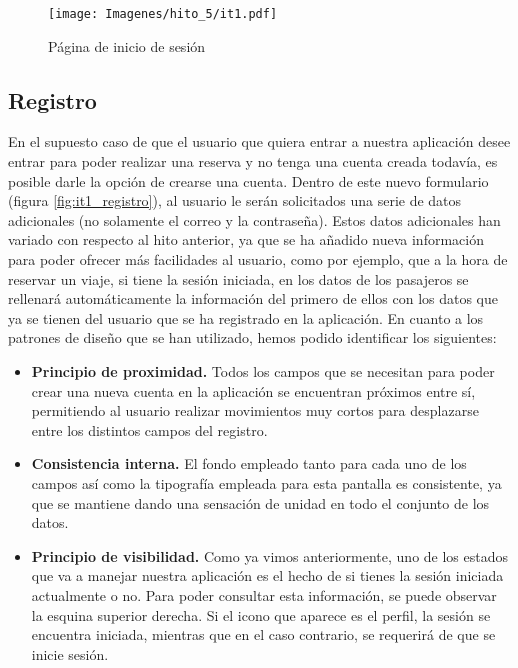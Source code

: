 \begin{figure}[H]
    \centering
    \texttt{[image: Imagenes/hito\_5/it1.pdf]}
    \caption{Página de inicio de sesión}
    \label{fig:it1_inicio_sesion}
\end{figure}

\subsection*{Registro}

En el supuesto caso de que el usuario que quiera entrar a nuestra aplicación desee entrar para
poder realizar una reserva y no tenga una cuenta creada todavía, es posible darle la opción de
crearse una cuenta. Dentro de este nuevo formulario (figura \ref{fig:it1_registro}), al usuario le serán solicitados una serie
de datos adicionales (no solamente el correo y la contraseña). Estos datos adicionales han
variado con respecto al hito anterior, ya que se ha añadido nueva información para poder ofrecer
más facilidades al usuario, como por ejemplo, que a la hora de reservar un viaje, si tiene la
sesión iniciada, en los datos de los pasajeros se rellenará automáticamente la información del
primero de ellos con los datos que ya se tienen del usuario que se ha registrado en la aplicación.
En cuanto a los patrones de diseño que se han utilizado, hemos podido identificar los siguientes:


\begin{itemize}
    \item \textbf{Principio de proximidad.} Todos los campos que se necesitan para poder crear una nueva
        cuenta en la aplicación se encuentran próximos entre sí, permitiendo al usuario realizar
        movimientos muy cortos para desplazarse entre los distintos campos del registro.
    \item \textbf{Consistencia interna.} El fondo empleado tanto para cada uno de los campos así
        como la tipografía empleada para esta pantalla es consistente, ya que se mantiene dando
        una sensación de unidad en todo el conjunto de los datos.
    \item \textbf{Principio de visibilidad.} Como ya vimos anteriormente, uno de los estados que va a
        manejar nuestra aplicación es el hecho de si tienes la sesión iniciada actualmente o no.
        Para poder consultar esta información, se puede observar la esquina superior derecha. Si
        el icono que aparece es el perfil, la sesión se encuentra iniciada, mientras que en el
        caso contrario, se requerirá de que se inicie sesión.
\end{itemize}

